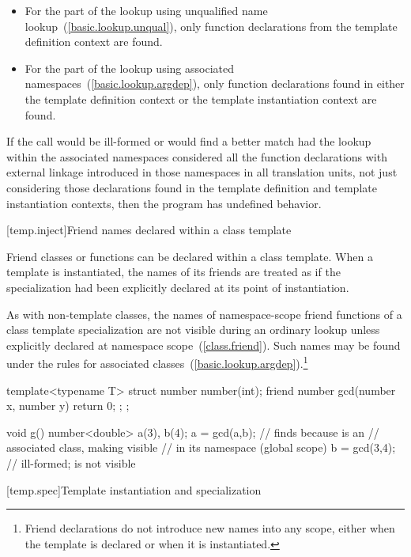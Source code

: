 \begin{itemize}
\item
For the part of the lookup using unqualified name lookup~(\ref{basic.lookup.unqual}),
only function declarations
from the template definition context are found.
\item
For the part of the lookup using associated namespaces~(\ref{basic.lookup.argdep}),
only function declarations found in either the template
definition context or the template instantiation context are found.
\end{itemize}

If
the call would be ill-formed or would find a better match had the lookup
within the associated namespaces considered all the function declarations with
external linkage introduced in those namespaces in all translation units,
not just considering those declarations found in the template definition and
template instantiation contexts, then the program has undefined behavior.

[temp.inject]{Friend names declared within a class template}

\pnum
Friend classes or functions can be declared within a class template.
When a template is instantiated, the names of its friends are treated
as if the specialization had been explicitly declared at its point of
instantiation.

\pnum
As with non-template classes, the names of namespace-scope friend
functions of a class template specialization are not visible during
an ordinary lookup unless explicitly declared at namespace scope~(\ref{class.friend}).
Such names may be found under the rules for associated
classes~(\ref{basic.lookup.argdep}).\footnote{Friend declarations do not
introduce new names into any scope, either
when the template is declared or when it is instantiated.}
\enterexample
\begin{codeblock}
template<typename T> struct number {
  number(int);
  friend number gcd(number x, number y) { return 0; };
};

void g() {
  number<double> a(3), b(4);
  a = gcd(a,b);     // finds  because  is an
                    // associated class, making  visible
                    // in its namespace (global scope)
  b = gcd(3,4);     // ill-formed;  is not visible
}
\end{codeblock}
\exitexample

[temp.spec]{Template instantiation and specialization}


